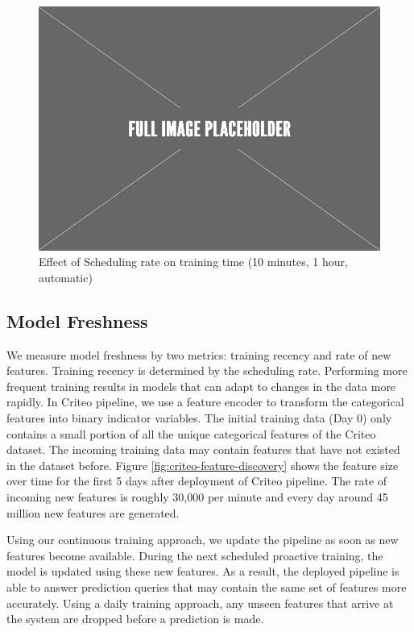 \begin{figure}[h!]
\centering
\includegraphics[width=\columnwidth]{../images/placeholder.jpeg}
\caption{Effect of Scheduling rate on training time (10 minutes, 1 hour, automatic)}
\label{fig:scheduling-policy-time}
\vspace{2mm}
\end{figure}


\subsection{Model Freshness}\label{subsec:model-freshness}
We measure model freshness by two metrics: training recency and rate of new features.
Training recency is determined by the scheduling rate.
Performing more frequent training results in models that can adapt to changes in the data more rapidly.
In Criteo pipeline, we use a feature encoder to transform the categorical features into binary indicator variables.
The initial training data (Day 0) only contains a small portion of all the unique categorical features of the Criteo dataset.
The incoming training data may contain features that have not existed in the dataset before.
Figure \ref{fig:criteo-feature-discovery} shows the feature size over time for the first 5 days after deployment of Criteo pipeline.
The rate of incoming new features is roughly 30,000 per minute and every day around 45 million new features are generated.

Using our continuous training approach, we update the pipeline as soon as new features become available.
During the next scheduled proactive training, the model is updated using these new features.
As a result, the deployed pipeline is able to answer prediction queries that may contain the same set of features more accurately.
Using a daily training approach, any unseen features that arrive at the system are dropped before a prediction is made.

